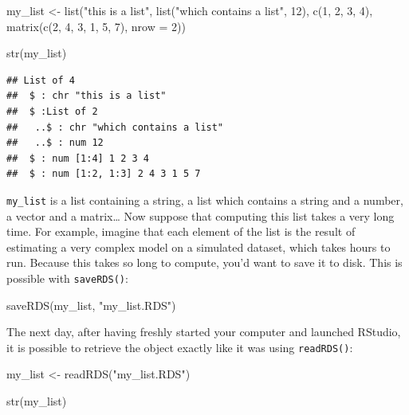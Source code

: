 \documentclass[
]{article}
\newenvironment{Shaded}{\begin{snugshade}}{\end{snugshade}}
\newcommand{\AttributeTok}[1]{\textcolor[rgb]{0.77,0.63,0.00}{#1}}
\newcommand{\DecValTok}[1]{\textcolor[rgb]{0.00,0.00,0.81}{#1}}
\newcommand{\FunctionTok}[1]{\textcolor[rgb]{0.00,0.00,0.00}{#1}}
\newcommand{\NormalTok}[1]{#1}
\newcommand{\OtherTok}[1]{\textcolor[rgb]{0.56,0.35,0.01}{#1}}
\newcommand{\StringTok}[1]{\textcolor[rgb]{0.31,0.60,0.02}{#1}}
\begin{document}
\begin{Shaded}
\begin{Highlighting}[]
\NormalTok{my\_list }\OtherTok{\textless{}{-}} \FunctionTok{list}\NormalTok{(}\StringTok{"this is a list"}\NormalTok{,}
                \FunctionTok{list}\NormalTok{(}\StringTok{"which contains a list"}\NormalTok{, }\DecValTok{12}\NormalTok{),}
                \FunctionTok{c}\NormalTok{(}\DecValTok{1}\NormalTok{, }\DecValTok{2}\NormalTok{, }\DecValTok{3}\NormalTok{, }\DecValTok{4}\NormalTok{),}
                \FunctionTok{matrix}\NormalTok{(}\FunctionTok{c}\NormalTok{(}\DecValTok{2}\NormalTok{, }\DecValTok{4}\NormalTok{, }\DecValTok{3}\NormalTok{, }\DecValTok{1}\NormalTok{, }\DecValTok{5}\NormalTok{, }\DecValTok{7}\NormalTok{),}
                       \AttributeTok{nrow =} \DecValTok{2}\NormalTok{))}

\FunctionTok{str}\NormalTok{(my\_list)}
\end{Highlighting}
\end{Shaded}

\begin{verbatim}
## List of 4
##  $ : chr "this is a list"
##  $ :List of 2
##   ..$ : chr "which contains a list"
##   ..$ : num 12
##  $ : num [1:4] 1 2 3 4
##  $ : num [1:2, 1:3] 2 4 3 1 5 7
\end{verbatim}

\texttt{my\_list} is a list containing a string, a list which contains a string and a number, a vector and
a matrix\ldots{} Now suppose that computing this list takes a very long time. For example, imagine that
each element of the list is the result of estimating a very complex model on a simulated
dataset, which takes hours to run. Because this takes so long to compute, you'd want to save
it to disk. This is possible with \texttt{saveRDS()}:

\begin{Shaded}
\begin{Highlighting}[]
\FunctionTok{saveRDS}\NormalTok{(my\_list, }\StringTok{"my\_list.RDS"}\NormalTok{)}
\end{Highlighting}
\end{Shaded}

The next day, after having freshly started your computer and launched RStudio, it is possible to
retrieve the object exactly like it was using \texttt{readRDS()}:

\begin{Shaded}
\begin{Highlighting}[]
\NormalTok{my\_list }\OtherTok{\textless{}{-}} \FunctionTok{readRDS}\NormalTok{(}\StringTok{"my\_list.RDS"}\NormalTok{)}

\FunctionTok{str}\NormalTok{(my\_list)}
\end{Highlighting}
\end{Shaded}
\end{document}
